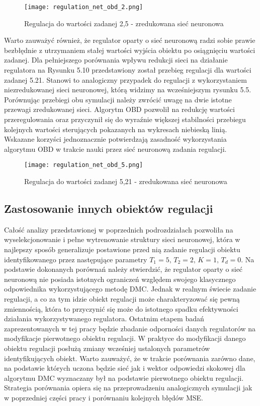 \begin{figure}[!h]
  \label{fig:Regulation-OBD-2}
  \centering \texttt{[image: regulation\_net\_obd\_2.png]}
  \caption{Regulacja do wartości zadanej 2,5 - zredukowana sieć neuronowa}
\end{figure}

\par Warto zauważyć również, że regulator oparty o sieć neuronową radzi sobie prawie bezbłędnie z utrzymaniem stałej wartości wyjścia obiektu po osiągnięciu wartości zadanej. Dla pełniejszego porównania wpływu redukcji sieci na działanie regulatora na Rysunku 5.10 przedstawiony został przebieg regulacji dla wartości zadanej 5.21. Stanowi to analogiczny przypadek do regulacji z wykorzystaniem niezredukowanej sieci neuronowej, którą widzimy na wcześniejszym rysunku 5.5. Porównując przebiegi obu symulacji należy zwrócić uwagę na dwie istotne przewagi zredukowanej sieci. Algorytm OBD pozwolił na redukcję wartości przeregulowania oraz przyczynił się do wyraźnie większej stabilności przebiegu kolejnych wartości sterujących pokazanych na wykresach niebieską linią. Wskazane korzyści jednoznacznie potwierdzają zasadność wykorzystania algorytmu OBD w trakcie nauki przez sieć neuronową zadania regulacji.
 
\begin{figure}[!h]
  \label{fig:Regulation-OBD-5}
  \centering \texttt{[image: regulation\_net\_obd\_5.png]}
  \caption{Regulacja do wartości zadanej 5,21 - zredukowana sieć neuronowa}
\end{figure}

\subsection{Zastosowanie innych obiektów regulacji}

\par Całość analizy przedstawionej w poprzednich podrozdziałach pozwoliła na wyselekcjonowanie i pełne wytrenowanie struktury sieci neuronowej, która w najlepszy sposób generalizuje postawione przed nią zadanie regulacji obiektu identyfikowanego przez następujące parametry \( T_1=5, \, T_2=2, \, K=1, \, T_d=0 \). Na podstawie dokonanych porównań należy stwierdzić, że regulator oparty o sieć neuronową nie posiada istotnych ograniczeń względem swojego klasycznego odpowiednika wykorzystującego metodę DMC. Jednak w realnym świecie zadanie regulacji, a co za tym idzie obiekt regulacji może charakteryzować się pewną zmiennością, która to przyczynić się może do istotnego spadku efektywności działania wykorzystywanego regulatora. Ostatnim etapem badań zaprezentowanych w tej pracy będzie zbadanie odporności danych regulatorów na modyfikacje pierwotnego obiektu regulacji. W praktyce do modyfikacji danego obiektu regulacji posłużą zmiany wcześniej ustalonych parametrów identyfikujących obiekt. Warto zauważyć, że w trakcie porównania zarówno dane, na podstawie których uczona będzie sieć jak i wektor odpowiedzi skokowej dla algorytmu DMC wyznaczany był na podstawie pierwotnego obiektu regulacji. Strategia porównania opiera się na przeprowadzeniu analogicznych symulacji jak w poprzedniej części pracy i porównaniu kolejnych błędów MSE.   

